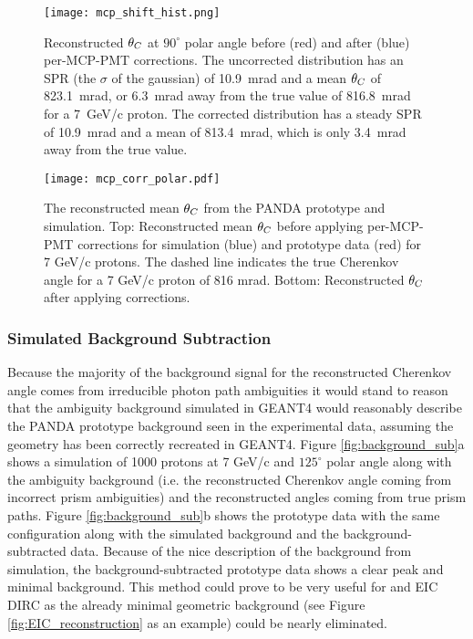 \begin{figure}[!htb]
	\centering
	\texttt{[image: mcp\_shift\_hist.png]}
	\caption[Reconstructed $\thetaC$ at $90^\circ$ polar angle before (red) and after (blue) per-MCP-PMT corrections.]{Reconstructed $\thetaC$ at $90^\circ$ polar angle before (red) and after (blue) per-MCP-PMT corrections. The uncorrected distribution has an SPR (the $\sigma$ of the gaussian) of 10.9~mrad and a mean $\thetaC$ of 823.1~mrad, or 6.3~mrad away from the true value of 816.8~mrad for a 7~GeV/c proton. The corrected distribution has a steady SPR of 10.9~mrad and a mean of 813.4~mrad, which is only 3.4~mrad away from the true value.}
	\label{fig:mcp_corr_hist}
\end{figure}


\begin{figure}[!htb]
	\centering
	\texttt{[image: mcp\_corr\_polar.pdf]}
	\caption[The reconstructed mean $\thetaC$ from the prototype data and simulation.]{The reconstructed mean $\thetaC$ from the PANDA prototype and simulation. Top: Reconstructed mean $\thetaC$ before applying per-MCP-PMT corrections for simulation (blue) and prototype data (red) for 7 GeV/c protons. The dashed line indicates the true Cherenkov angle for a 7 GeV/c proton of 816 mrad. Bottom: Reconstructed $\thetaC$ after applying corrections.}
	\label{fig:mcp_corr_polar}
\end{figure}


\subsubsection{Simulated Background Subtraction}
Because the majority of the background signal for the reconstructed Cherenkov angle comes from irreducible photon path ambiguities it would stand to reason that the ambiguity background simulated in GEANT4 would reasonably describe the PANDA prototype background seen in the experimental data, assuming the geometry has been correctly recreated in GEANT4. Figure \ref{fig:background_sub}a shows a simulation of 1000 protons at 7 GeV/c and $125^\circ$ polar angle along with the ambiguity background (i.e. the reconstructed Cherenkov angle coming from incorrect prism ambiguities) and the reconstructed angles coming from true prism paths. Figure \ref{fig:background_sub}b shows the prototype data with the same configuration along with the simulated background and the background-subtracted data. Because of the nice description of the background from simulation, the background-subtracted prototype data shows a clear peak and minimal background. This method could prove to be very useful for and EIC DIRC as the already minimal geometric background (see Figure \ref{fig:EIC_reconstruction} as an example) could be nearly eliminated.


